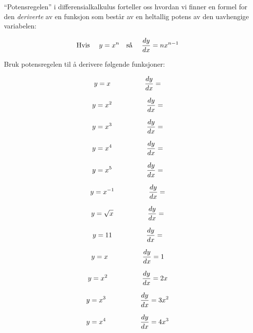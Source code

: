 

``Potensregelen'' i differensialkalkulus forteller oss hvordan vi finner en formel for den {\it deriverte} av en funksjon som består av en heltallig potens av den uavhengige variabelen:

$$\hbox{Hvis \hskip 10pt} y = x^n \hbox{\hskip 10pt så \hskip 10pt} {dy \over dx} = nx^{n-1}$$

\vskip 10pt

Bruk potensregelen til å derivere følgende funksjoner:

\vskip 20pt

$$y = x \hbox{\hskip 50pt} {dy \over dx} = $$

\vskip 20pt

$$y = x^2 \hbox{\hskip 50pt} {dy \over dx} = $$

\vskip 20pt

$$y = x^3 \hbox{\hskip 50pt} {dy \over dx} = $$

\vskip 20pt

$$y = x^4 \hbox{\hskip 50pt} {dy \over dx} = $$

\vskip 20pt

$$y = x^5 \hbox{\hskip 50pt} {dy \over dx} = $$

\vskip 20pt

$$y = x^{-1} \hbox{\hskip 50pt} {dy \over dx} = $$

\vskip 20pt

$$y = \sqrt{x} \hbox{\hskip 50pt} {dy \over dx} = $$

\vskip 20pt

$$y = 11 \hbox{\hskip 50pt} {dy \over dx} = $$







$$y = x \hbox{\hskip 50pt} {dy \over dx} = 1$$

\vskip 20pt

$$y = x^2 \hbox{\hskip 50pt} {dy \over dx} = 2x$$

\vskip 20pt

$$y = x^3 \hbox{\hskip 50pt} {dy \over dx} = 3x^2$$

\vskip 20pt

$$y = x^4 \hbox{\hskip 50pt} {dy \over dx} = 4x^3$$

